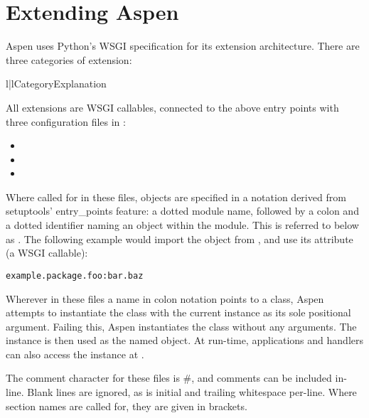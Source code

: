 \chapter{Extending Aspen \label{extending}}

Aspen uses Python's WSGI specification for its extension architecture. There are
three categories of extension:

\begin{tableii}{l|l}{}{Category}{Explanation}
\end{tableii}

All extensions are WSGI callables, connected to the above entry points with
three configuration files in :

\begin{itemize}
\item{}
\item{}
\item{}
\end{itemize}

Where called for in these files, objects are specified in a notation derived
from setuptools' entry_points feature: a dotted module name, followed by a colon
and a dotted identifier naming an object within the module. This is referred to
below as . The following example would import the 
object from , and use its  attribute (a WSGI
callable):

\begin{verbatim}
example.package.foo:bar.baz
\end{verbatim}

Wherever in these files a name in colon notation points to a class, Aspen
attempts to instantiate the class with the current  instance as
its sole positional argument. Failing this, Aspen instantiates the class without
any arguments. The instance is then used as the named object. At run-time,
applications and handlers can also access the  instance at
.

The comment character for these files is \#, and comments can be included
in-line. Blank lines are ignored, as is initial and trailing whitespace
per-line. Where section names are called for, they are given in brackets.


